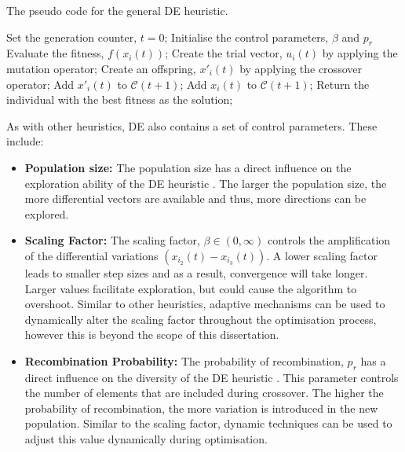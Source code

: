 \begin{algorithm}[H]
      \caption{The pseudo code for the general \ac{DE} heuristic.}
      \label{algo:heuristics:de:general_de}
      \begin{algorithmic}
            \State Set the generation counter, $t = 0$;
            \State Initialise the control parameters, $\beta$ and $p_{r}$
            \State Evaluate the fitness, $f(x_{i}(t))$;
            \State Create the trial vector, $u_{i}(t)$ by applying the mutation operator;
            \State Create an offspring, $x'_{i}(t)$ by applying the crossover operator;
            \State Add $x'_{i}(t)$ to $\mathcal{C}(t+1)$;
            \Else
            \State Add $x_{i}(t)$ to $\mathcal{C}(t+1)$;
            \EndIf
            \EndFor
            \EndWhile
            \State Return the individual with the best fitness as the solution;
      \end{algorithmic}
\end{algorithm}

As with other heuristics, \ac{DE} also contains a set of control parameters. These include:

\begin{itemize}
      \item \textbf{Population size:} The population size has a direct influence on the exploration ability of the \ac{DE} heuristic \cite{ref:engelbrecht:2007}. The larger the population size, the more differential vectors are available and thus, more directions can be explored.

      \item \textbf{Scaling Factor:} The scaling factor, $\beta \in (0, \infty)$ controls the amplification of the differential variations $(x_{i_{2}}(t) - x_{i_{3}}(t))$. A lower scaling factor leads to smaller step sizes and as a result, convergence will take longer. Larger values facilitate exploration, but could cause the algorithm to overshoot. Similar to other heuristics, adaptive mechanisms can be used to dynamically alter the scaling factor throughout the optimisation process, however this is beyond the scope of this dissertation.


      \item \textbf{Recombination Probability:} The probability of recombination, $p_{r}$ has a direct influence on the diversity of the \ac{DE} heuristic \cite{ref:engelbrecht:2007}. This parameter controls the number of elements that are included during crossover. The higher the probability of recombination, the more variation is introduced in the new population. Similar to the scaling factor, dynamic techniques can be used to adjust this value dynamically during optimisation.
\end{itemize}

